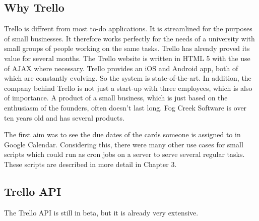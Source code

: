 \subsection{Why Trello}
Trello is diffrent from most to-do applications. It is streamlined for the purposes of small businesses. It therefore works perfectly for the needs of a university with small groups of people working on the same tasks. Trello has already proved its value for several months. The Trello website is written in HTML 5 with the use of AJAX where necessary. Trello provides an iOS \cite{trello:ios} and Android \cite{trello:android} app, both of which are constantly evolving. So the system is state-of-the-art. In addition, the company behind Trello is not just a start-up with three employees, which is also of importance. A product of a small business, which is just based on the enthusiasm of the founders, often doesn't last long. Fog Creek Software is over ten years old and has several products.

The first aim was to see the due dates of the cards someone is assigned to in Google Calendar. Considering this, there were many other use cases for small scripts which could run as cron jobs on a server to serve several regular tasks. These scripts are described in more detail in Chapter 3.

\subsection{Trello API}
The Trello API  is still in beta, but it is already very extensive. \cite{trello:docu}

